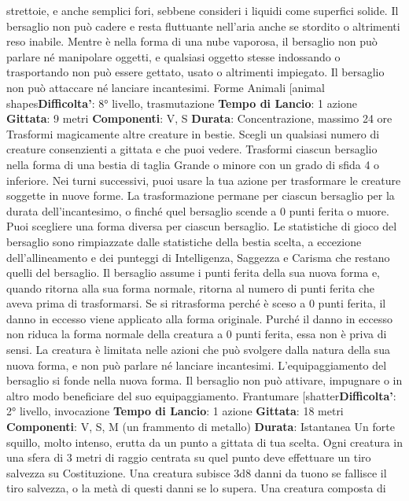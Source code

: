 \begin{multicols}{2}
strettoie, e anche semplici fori, sebbene consideri i
liquidi come superfici solide. Il bersaglio non può cadere
e resta fluttuante nell’aria anche se stordito o altrimenti
reso inabile.
Mentre è nella forma di una nube vaporosa, il bersaglio
non può parlare né manipolare oggetti, e qualsiasi
oggetto stesse indossando o trasportando non può
essere gettato, usato o altrimenti impiegato. Il bersaglio
non può attaccare né lanciare incantesimi.
Forme Animali
[animal shapes\textbf{Difficolta'}:
8° livello, trasmutazione
\textbf{Tempo di Lancio}: 1 azione
\textbf{Gittata}: 9 metri
\textbf{Componenti}: V, S
\textbf{Durata}: Concentrazione, massimo 24 ore
Trasformi magicamente altre creature in bestie. Scegli
un qualsiasi numero di creature consenzienti a gittata e
che puoi vedere. Trasformi ciascun bersaglio nella
forma di una bestia di taglia Grande o minore con un
grado di sfida 4 o inferiore. Nei turni successivi, puoi
usare la tua azione per trasformare le creature soggette
in nuove forme.
La trasformazione permane per ciascun bersaglio per la
durata dell’incantesimo, o finché quel bersaglio scende
a 0 punti ferita o muore. Puoi scegliere una forma
diversa per ciascun bersaglio. Le statistiche di gioco del
bersaglio sono rimpiazzate dalle statistiche della bestia
scelta, a eccezione dell’allineamento e dei punteggi di
Intelligenza, Saggezza e Carisma che restano quelli del
bersaglio. Il bersaglio assume i punti ferita della sua
nuova forma e, quando ritorna alla sua forma normale,
ritorna al numero di punti ferita che aveva prima di
trasformarsi. Se si ritrasforma perché è sceso a 0 punti
ferita, il danno in eccesso viene applicato alla forma
originale. Purché il danno in eccesso non riduca la
forma normale della creatura a 0 punti ferita, essa non
è priva di sensi. La creatura è limitata nelle azioni che
può svolgere dalla natura della sua nuova forma, e non
può parlare né lanciare incantesimi.
L’equipaggiamento del bersaglio si fonde nella nuova
forma. Il bersaglio non può attivare, impugnare o in altro
modo beneficiare del suo equipaggiamento.
Frantumare
[shatter\textbf{Difficolta'}:
2° livello, invocazione
\textbf{Tempo di Lancio}: 1 azione
\textbf{Gittata}: 18 metri
\textbf{Componenti}: V, S, M (un frammento di metallo)
\textbf{Durata}: Istantanea
Un forte squillo, molto intenso, erutta da un punto a
gittata di tua scelta. Ogni creatura in una sfera di 3
metri di raggio centrata su quel punto deve effettuare
un tiro salvezza su Costituzione. Una creatura subisce
3d8 danni da tuono se fallisce il tiro salvezza, o la metà
di questi danni se lo supera. Una creatura composta di

\end{multicols}
